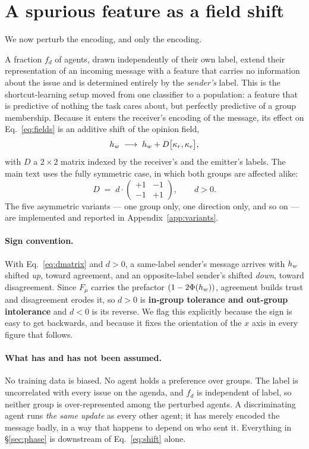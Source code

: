 \section{A spurious feature as a field shift}
\label{sec:spurious}

We now perturb the encoding, and only the encoding.

A fraction $f_d$ of agents, drawn independently of their own label, extend their
representation of an incoming message with a feature that carries no information
about the issue and is determined entirely by the \emph{sender's} label. This is
the shortcut-learning setup moved from one classifier to a population: a feature
that is predictive of nothing the task cares about, but perfectly predictive of a
group membership. Because it enters the receiver's encoding of the message, its
effect on Eq.~\ref{eq:fields} is an additive shift of the opinion field,
\begin{equation}
  h_{w} \;\longrightarrow\; h_{w} + D\bigl[\kappa_r, \kappa_e\bigr],
  \label{eq:shift}
\end{equation}
with $D$ a $2 \times 2$ matrix indexed by the receiver's and the emitter's labels.
The main text uses the fully symmetric case, in which both groups are affected
alike:
\begin{equation}
  D \;=\; d \cdot \begin{pmatrix} +1 & -1 \\ -1 & +1 \end{pmatrix},
  \qquad d > 0 .
  \label{eq:dmatrix}
\end{equation}
The five asymmetric variants --- one group only, one direction only, and so on ---
are implemented and reported in Appendix~\ref{app:variants}.

\paragraph{Sign convention.} With Eq.~\ref{eq:dmatrix} and $d > 0$, a same-label
sender's message arrives with $h_{w}$ shifted \emph{up}, toward agreement, and an
opposite-label sender's shifted \emph{down}, toward disagreement. Since $F_\mu$
carries the prefactor $(1 - 2\Phi(h_{w}))$, agreement builds trust and disagreement
erodes it, so $d > 0$ is \textbf{in-group tolerance and out-group intolerance} and
$d < 0$ is its reverse. We flag this explicitly because the sign is easy to get
backwards, and because it fixes the orientation of the $x$ axis in every figure
that follows.

\paragraph{What has and has not been assumed.} No training data is biased. No
agent holds a preference over groups. The label is uncorrelated with every issue
on the agenda, and $f_d$ is independent of label, so neither group is
over-represented among the perturbed agents. A discriminating agent runs
\emph{the same update} as every other agent; it has merely encoded the message
badly, in a way that happens to depend on who sent it. Everything in
\S\ref{sec:phase} is downstream of Eq.~\ref{eq:shift} alone.

